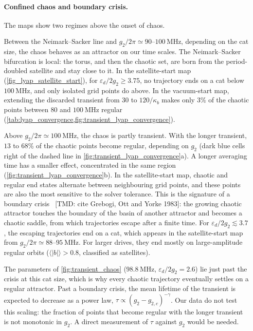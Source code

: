 \documentclass[aps,prx,reprint,floatfix,amsmath,amssymb,longbibliography]{revtex4-2}
\newcommand{\eps}{\varepsilon}
\newcommand{\TMD}[1]{{\color{Blue} [TMD: {#1}]}}
\begin{document}
\paragraph*{Confined chaos and boundary crisis.}
The maps show two regimes above the onset of chaos.

Between the Neimark--Sacker line and $g_2/2\pi\simeq90$--$100~\mathrm{MHz}$, depending on the cat size, the chaos behaves as an attractor on our time scales. The Neimark--Sacker bifurcation is local: the torus, and then the chaotic set, are born from the period-doubled satellite and stay close to it. In the satellite-start map (\cref{fig_lyap_satellite_start}), for $\eps_d/2g_2\ge3.75$, no trajectory ends on a cat below $100~\mathrm{MHz}$, and only isolated grid points do above. In the vacuum-start map, extending the discarded transient from $30$ to $120/\kappa_b$ makes only $3\%$ of the chaotic points between $80$ and $100~\mathrm{MHz}$ regular (\cref{tab:lyap_convergence,fig:transient_lyap_convergence}).

Above $g_2/2\pi\simeq100~\mathrm{MHz}$, the chaos is partly transient. With the longer transient, $13$ to $68\%$ of the chaotic points become regular, depending on $g_2$ (dark blue cells right of the dashed line in \cref{fig:transient_lyap_convergence}a). A longer averaging time has a smaller effect, concentrated in the same region (\cref{fig:transient_lyap_convergence}b). In the satellite-start map, chaotic and regular end states alternate between neighbouring grid points, and these points are also the most sensitive to the solver tolerance. This is the signature of a boundary crisis~\TMD{cite Grebogi, Ott and Yorke 1983}: the growing chaotic attractor touches the boundary of the basin of another attractor and becomes a chaotic saddle, from which trajectories escape after a finite time. For $\eps_d/2g_2\lesssim3.7$, the escaping trajectories end on a cat, which appears in the satellite-start map from $g_2/2\pi\simeq88$--$95~\mathrm{MHz}$. For larger drives, they end mostly on large-amplitude regular orbits ($\langle|b|\rangle>0.8$, classified as satellites).

The parameters of \cref{fig:transient_chaos} ($98.8~\mathrm{MHz}$, $\eps_d/2g_2=2.6$) lie just past the crisis at this cat size, which is why every chaotic trajectory eventually settles on a regular attractor. Past a boundary crisis, the mean lifetime of the transient is expected to decrease as a power law, $\tau\propto(g_2-g_{2,c})^{-\gamma}$. Our data do not test this scaling: the fraction of points that become regular with the longer transient is not monotonic in $g_2$. A direct measurement of $\tau$ against $g_2$ would be needed.
\end{document}

